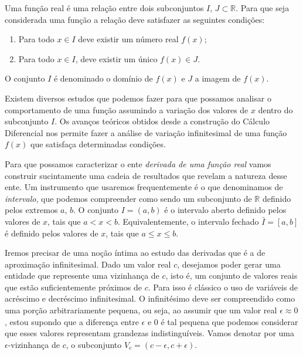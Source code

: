 \begin{definition}
  Uma função real é uma relação entre dois subconjuntos $I$, $J \subset \mathbb{R}$. Para que seja considerada uma função a relação deve satisfazer as seguintes condições:				
  \begin{enumerate}
  \item Para todo $x \in I$ deve existir um número real $f(x)$;
  \item Para todo $x \in I$, deve existir um único $f(x) \in J$.
  \end{enumerate}
  O conjunto $I$ é denominado o domínio de $f(x)$ e $J$ a imagem de $f(x)$.
\end{definition}


\par Existem diversos estudos que podemos fazer para que possamos analisar o comportamento de uma função assumindo a variação dos valores de $x$ dentro do subconjunto $I$. Os avanços teóricos obtidos desde a construção do Cálculo Diferencial nos permite fazer a análise de variação infinitesimal de uma função $f(x)$ que satisfaça determinadas condições. 

\par Para que possamos caracterizar o ente \textit{derivada de uma função real } vamos construir sucintamente uma cadeia de resultados que revelam a natureza desse ente. Um instrumento que usaremos frequentemente é o que denominamos de \textit{intervalo}, que podemos compreender como sendo um subconjunto de $\mathbb{R}$ definido pelos extremos $a$, $b$. O conjunto $I = (a,b)$ é o intervalo aberto definido pelos valores de $x$, tais que $ a < x < b$. Equivalentemente, o intervalo fechado $\bar{I}= [a,b]$ é definido pelos valores de $x$, tais que $a \leq x \leq b$. 

\par Iremos precisar de uma noção íntima ao estudo das derivadas que é a de aproximação infinitesimal. Dado um valor real $c$, desejamos poder gerar uma entidade que represente uma vizinhança de $c$, isto é, um conjunto de valores reais que estão suficientemente próximos de $c$. Para isso é clássico o uso de variáveis de acréscimo e decréscimo infinitesimal. O infinitésimo deve ser compreendido como uma porção arbitrariamente pequena, ou seja, ao assumir que um valor real $\epsilon \approx 0$, estou supondo que a diferença entre $\epsilon$ e $0$ é tal pequena que podemos considerar que esses valores representam grandezas indistinguíveis. Vamos denotar por uma $\epsilon$-vizinhança de $c$, o subconjunto $V_{c} = (c-\epsilon, c+ \epsilon)$. 


